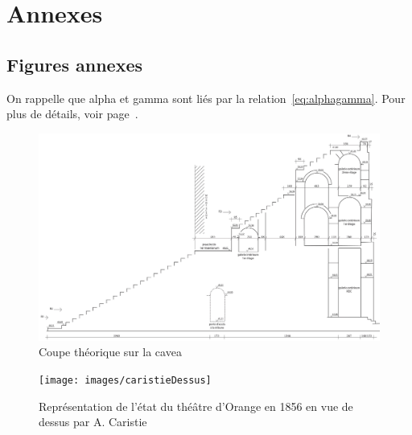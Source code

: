 \chapter{Annexes}



\section{Figures annexes}
	\blindtext
	On rappelle que \gls{alpha} et \gls{gamma} sont liés par la relation~\eqref{eq:alphagamma}. Pour plus de détails, voir page~\pageref{eq:alphagamma}.

\begin{figure}[!h]
	\includegraphics[width=\linewidth]{images/CoupeCavea}
	\caption[Coupe théorique sur la \gls{cavea}]{Coupe théorique sur la \gls{cavea} \cite[Pl. LX]{orangePl}} 
	\label{coupeCavea} 
\end{figure} 

\begin{figure}[!h]
	\texttt{[image: images/caristieDessus]}
	\caption[Vue de dessus par A. Caristie 1856]{Représentation de l'état du théâtre d'Orange en 1856 en vue de dessus par A. Caristie \cite[Pl. I]{orangePl}} 
	\label{caristieDessus} 
\end{figure} 
	
